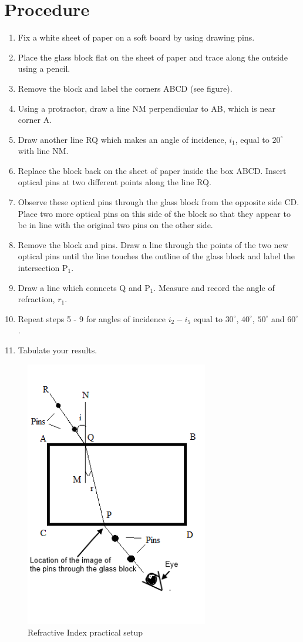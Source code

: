 \section{Procedure}
\begin{enumerate}
\item Fix a white sheet of paper on a soft board by using drawing pins.
\item Place the glass block flat on the sheet of paper and trace along the outside using a pencil.
\item Remove the block and label the corners ABCD (see figure).
\item Using a protractor, draw a line NM perpendicular to AB, which is near corner A.
\item Draw another line RQ which makes an angle of incidence, $i_1$, equal to $20^\circ$ with line NM.
\item Replace the block back on the sheet of paper inside the box ABCD. Insert optical pins at two different points along the line RQ. 
\item Observe these optical pins through the glass block from the opposite side CD. Place two more optical pins on this side of the block so that they appear to be in line with the original two pins on the other side. 
\item Remove the block and pins. Draw a line through the points of the two new optical pins until the line touches the outline of the glass block and label the intersection P$_1$.
\item Draw a line which connects Q and P$_1$. Measure and record the angle of refraction, $r_1$.
\item Repeat steps 5 - 9 for angles of incidence $i_2-i_5$ equal to $30^\circ$, $40^\circ$, $50^\circ$ and $60^\circ$. 
\item Tabulate your results.
\end{enumerate}


\begin{figure}[h!]
\centering
\includegraphics[width=8cm]{./img/refractive-index-1.png}
\caption{Refractive Index practical setup}
\label{fig:refractive-index-1}
\end{figure}

